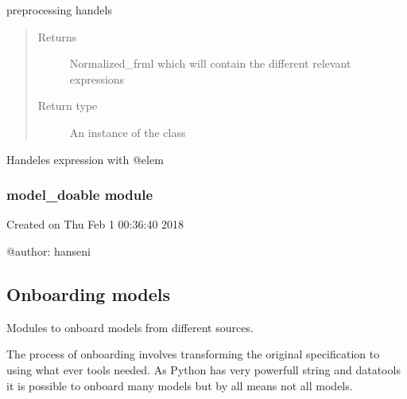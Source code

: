 \documentclass[letterpaper,10pt,english]{sphinxmanual}
\begin{document}
\begin{fulllineitems}
\sphinxAtStartPar
preprocessing handels
\begin{quote}\begin{description}
\item[{Returns}] \leavevmode
\sphinxAtStartPar
Normalized\_frml which will contain the different relevant expressions

\item[{Return type}] \leavevmode
\sphinxAtStartPar
An instance of the class

\end{description}\end{quote}

\end{fulllineitems}


\begin{fulllineitems}
\label{\detokenize{onboard/modelnormalize:modelnormalize.elem_trans}}
\pysigstartsignatures
{}
\pysigstopsignatures
\sphinxAtStartPar
Handeles expression with @elem

\end{fulllineitems}


\sphinxstepscope


\subsubsection{model\_doable module}
\label{\detokenize{onboard/model_doable:module-model_doable}}\label{\detokenize{onboard/model_doable:model-doable-module}}\label{\detokenize{onboard/model_doable::doc}}
\sphinxAtStartPar
Created on Thu Feb  1 00:36:40 2018

\sphinxAtStartPar
@author: hanseni


\subsection{Onboarding models}
\label{\detokenize{onboard/onboard:onboarding-models}}
\sphinxAtStartPar
Modules to onboard models from different sources.

\sphinxAtStartPar
The process of onboarding involves transforming the original specification
to  using what ever tools needed. As Python has very
powerfull string and datatools it is possible to onboard many models \sphinxhyphen{} but by all means not all models.
\end{document}
